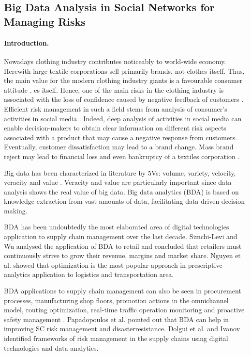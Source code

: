 \subsection{Big Data Analysis in Social Networks for Managing Risks}\label{subsec:ch6/sec1/sub1}

\paragraph{Introduction.} Nowadays clothing industry contributes noticeably to world-wide economy. Herewith large textile corporations sell primarily brands, not clothes itself. Thus, the main value for the modern clothing industry giants is a favourable consumer attitude \cite{Choi}. es itself. Hence, one of the main risks in the clothing industry is associated with the loss of confidence caused by negative feedback of customers \cite{IvanovDolguiSokolovIvanova,ChiuChoiDai}. Efficient risk management in such a field stems from analysis of consumer’s activities in social media \cite{Choi}. Indeed, deep analysis of activities in social media can enable decision-makers to obtain clear information on different risk aspects associated with a product that may cause a negative response from customers. Eventually, customer dissatisfaction may lead to a brand change. Mass brand reject may lead to financial loss and even bankruptcy of a textiles corporation \cite{TianChoiDing}.

Big data has been characterized in literature by 5Vs: volume, variety, velocity, veracity and value \cite{GunasekaranTiwariDubey}. Veracity and value are particularly important since data analysis shows the real value of big data. Big data analytics (BDA) is based on knowledge extraction from vast amounts of data, facilitating data-driven decision-making.

BDA has been undoubtedly the most elaborated area of digital technologies application to supply chain management over the last decade. Simchi-Levi and Wu \cite{SimchiLeviWu} analysed the application of BDA to retail and concluded that retailers must continuously strive to grow their revenue, margins and market share. Nguyen et al. \cite{NguyenZhouSpiegler} showed that optimization is the most popular approach in prescriptive analytics application to logistics and transportation area.

BDA applications to supply chain management can also be seen in procurement processes, manufacturing shop floors, promotion actions in the omnichannel model, routing optimization, real-time traffic operation monitoring and proactive safety management \cite{GunasekaranTiwariDubey,NguyenZhouSpiegler}. Papadopoulos et al. \cite{PapadopoulosGunasekaranDubey} pointed out that BDA can help in improving SC risk management and disasterresistance. Dolgui et al. \cite{DolguiIvanovSokolov} and Ivanov \cite{Ivanov} identified frameworks of risk management in the supply chains using digital technologies and data analytics.

